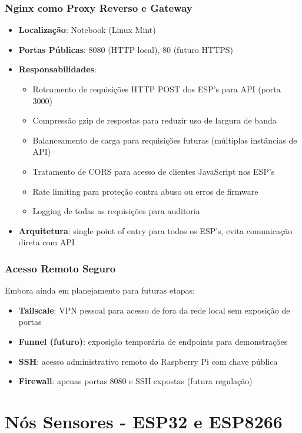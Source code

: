 \documentclass[12pt,a4paper,oneside]{report}
\begin{document}
\subsection{Nginx como Proxy Reverso e Gateway}
\begin{itemize}[leftmargin=1.2cm]
    \item \textbf{Localização}: Notebook (Linux Mint)
    \item \textbf{Portas Públicas}: 8080 (HTTP local), 80 (futuro HTTPS)
    \item \textbf{Responsabilidades}:
    \begin{itemize}
        \item Roteamento de requisições HTTP POST dos ESP's para API (porta 3000)
        \item Compressão gzip de respostas para reduzir uso de largura de banda
        \item Balanceamento de carga para requisições futuras (múltiplas instâncias de API)
        \item Tratamento de CORS para acesso de clientes JavaScript nos ESP's
        \item Rate limiting para proteção contra abuso ou erros de firmware
        \item Logging de todas as requisições para auditoria
    \end{itemize}
    \item \textbf{Arquitetura}: single point of entry para todos os ESP's, evita comunicação direta com API
\end{itemize}

\subsection{Acesso Remoto Seguro}
Embora ainda em planejamento para futuras etapas:
\begin{itemize}[leftmargin=1.2cm]
    \item \textbf{Tailscale}: VPN pessoal para acesso de fora da rede local sem exposição de portas
    \item \textbf{Funnel (futuro)}: exposição temporária de endpoints para demonstrações
    \item \textbf{SSH}: acesso administrativo remoto do Raspberry Pi com chave pública
    \item \textbf{Firewall}: apenas portas 8080 e SSH expostas (futura regulação)
\end{itemize}

\chapter{Nós Sensores - ESP32 e ESP8266}
\end{document}
